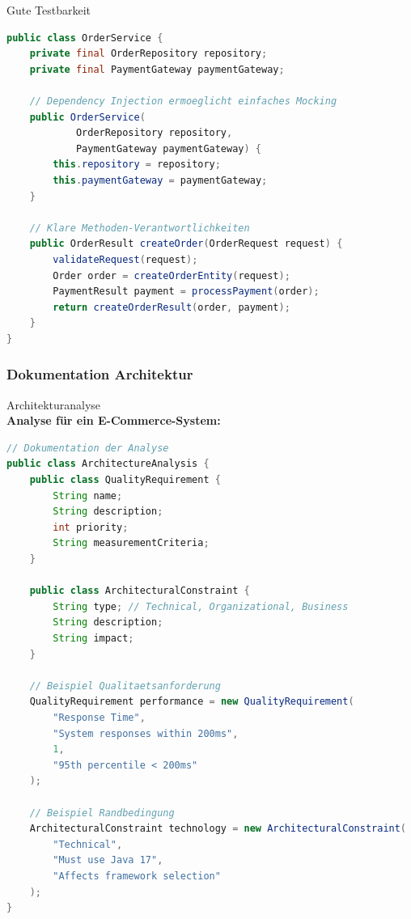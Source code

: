 \begin{example2}{Gute Testbarkeit}\\

\begin{lstlisting}[language=Java, style=basesmol]
public class OrderService {
    private final OrderRepository repository;
    private final PaymentGateway paymentGateway;
    
    // Dependency Injection ermoeglicht einfaches Mocking
    public OrderService(
            OrderRepository repository,
            PaymentGateway paymentGateway) {
        this.repository = repository;
        this.paymentGateway = paymentGateway;
    }
    
    // Klare Methoden-Verantwortlichkeiten
    public OrderResult createOrder(OrderRequest request) {
        validateRequest(request);
        Order order = createOrderEntity(request);
        PaymentResult payment = processPayment(order);
        return createOrderResult(order, payment);
    }
}
\end{lstlisting}
\end{example2}

\subsubsection{Dokumentation Architektur}

\begin{example2}{Architekturanalyse}\\
\textbf{Analyse für ein E-Commerce-System:}

\begin{lstlisting}[language=Java, style=basesmol]
// Dokumentation der Analyse
public class ArchitectureAnalysis {
    public class QualityRequirement {
        String name;
        String description;
        int priority;
        String measurementCriteria;
    }
    
    public class ArchitecturalConstraint {
        String type; // Technical, Organizational, Business
        String description;
        String impact;
    }
    
    // Beispiel Qualitaetsanforderung
    QualityRequirement performance = new QualityRequirement(
        "Response Time",
        "System responses within 200ms",
        1,
        "95th percentile < 200ms"
    );
    
    // Beispiel Randbedingung
    ArchitecturalConstraint technology = new ArchitecturalConstraint(
        "Technical",
        "Must use Java 17",
        "Affects framework selection"
    );
}
\end{lstlisting}
\end{example2}

